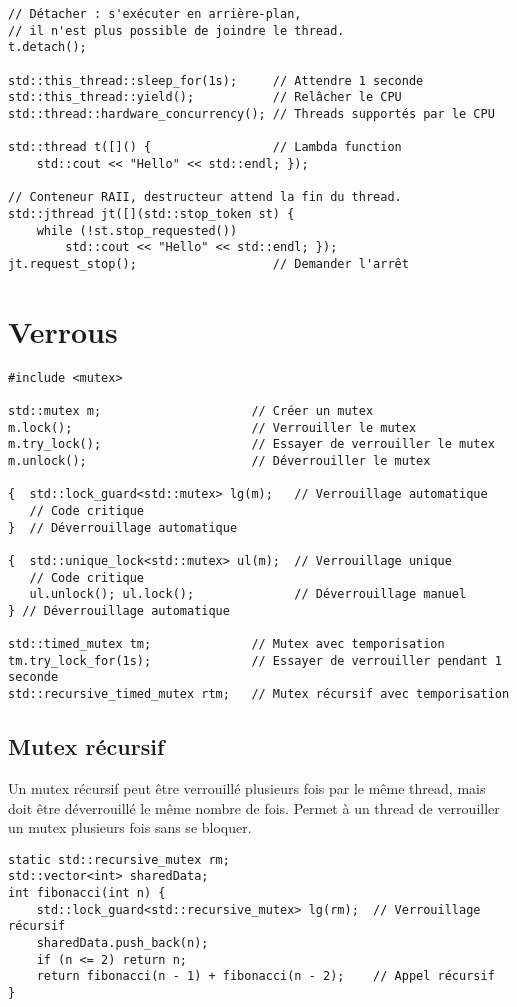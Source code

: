 \documentclass{article}
\begin{document}
\begin{multicols*}{3}
\begin{lstlisting}
// Détacher : s'exécuter en arrière-plan,
// il n'est plus possible de joindre le thread.
t.detach();

std::this_thread::sleep_for(1s);     // Attendre 1 seconde
std::this_thread::yield();           // Relâcher le CPU
std::thread::hardware_concurrency(); // Threads supportés par le CPU

std::thread t([]() {                 // Lambda function
    std::cout << "Hello" << std::endl; });

// Conteneur RAII, destructeur attend la fin du thread.
std::jthread jt([](std::stop_token st) {
    while (!st.stop_requested())
        std::cout << "Hello" << std::endl; });
jt.request_stop();                   // Demander l'arrêt
\end{lstlisting}

\section*{Verrous}
\begin{lstlisting}
#include <mutex>

std::mutex m;                     // Créer un mutex
m.lock();                         // Verrouiller le mutex
m.try_lock();                     // Essayer de verrouiller le mutex
m.unlock();                       // Déverrouiller le mutex

{  std::lock_guard<std::mutex> lg(m);   // Verrouillage automatique
   // Code critique
}  // Déverrouillage automatique

{  std::unique_lock<std::mutex> ul(m);  // Verrouillage unique
   // Code critique
   ul.unlock(); ul.lock();              // Déverrouillage manuel
} // Déverrouillage automatique

std::timed_mutex tm;              // Mutex avec temporisation
tm.try_lock_for(1s);              // Essayer de verrouiller pendant 1 seconde
std::recursive_timed_mutex rtm;   // Mutex récursif avec temporisation
\end{lstlisting}

\subsection*{Mutex récursif}
Un mutex récursif peut être verrouillé plusieurs fois par le même thread, mais doit être déverrouillé le même nombre de fois. Permet à un thread de verrouiller un mutex plusieurs fois sans se bloquer.

\begin{lstlisting}
static std::recursive_mutex rm;
std::vector<int> sharedData;
int fibonacci(int n) {
    std::lock_guard<std::recursive_mutex> lg(rm);  // Verrouillage récursif
    sharedData.push_back(n);
    if (n <= 2) return n;
    return fibonacci(n - 1) + fibonacci(n - 2);    // Appel récursif
}
\end{lstlisting}


\end{multicols*}
\end{document}
